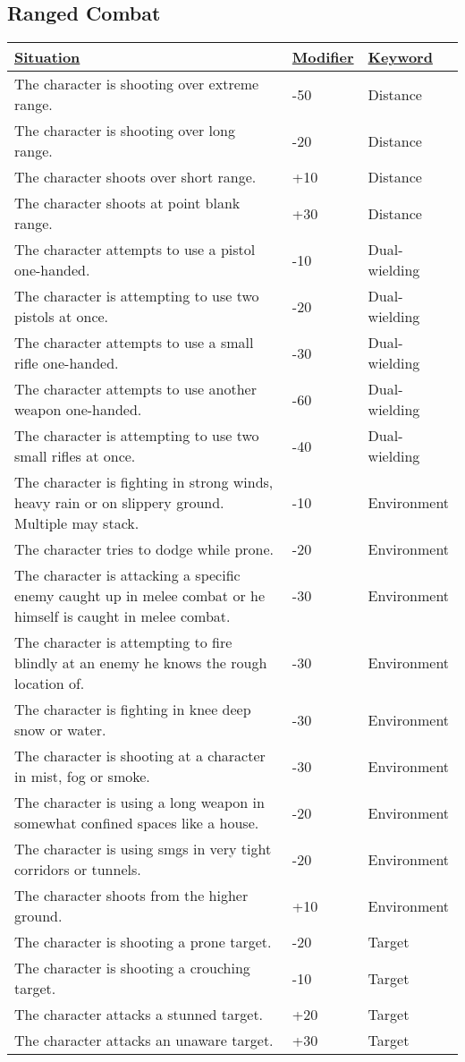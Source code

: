 \subsection{Ranged Combat}
\begin{tabularx}{\textwidth}{|X|l|l|}
	\hline
	\ul{Situation} & \ul{Modifier} & \ul{Keyword} \\ \hline
	The character is shooting over extreme range. & -50 & Distance \\ \hline
	The character is shooting over long range. & -20 & Distance \\ \hline
	The character shoots over short range. & +10 & Distance \\ \hline
	The character shoots at point blank range. & +30 & Distance \\ \hline
	The character attempts to use a pistol one-handed. & -10 & Dual-wielding \\ \hline
	The character is attempting to use two pistols at once. & -20 & Dual-wielding \\ \hline
	The character attempts to use a small rifle one-handed. & -30 & Dual-wielding \\ \hline
	The character attempts to use another weapon one-handed. & -60 & Dual-wielding \\ \hline
	The character is attempting to use two small rifles at once. & -40 & Dual-wielding \\ \hline
	The character is fighting in strong winds, heavy rain or on slippery ground. Multiple may stack. & -10 & Environment \\ \hline
	The character tries to dodge while prone. & -20 & Environment \\ \hline
	The character is attacking a specific enemy caught up in melee combat or he himself is caught in melee combat. & -30 & Environment \\ \hline
	The character is attempting to fire blindly at an enemy he knows the rough location of. & -30 & Environment \\ \hline
	The character is fighting in knee deep snow or water. & -30 & Environment \\ \hline
	The character is shooting at a character in mist, fog or smoke. & -30 & Environment \\ \hline
	The character is using a long weapon in somewhat confined spaces like a house. & -20 & Environment \\ \hline
	The character is using smgs in very tight corridors or tunnels. & -20 & Environment \\ \hline
	The character shoots from the higher ground. & +10 & Environment \\ \hline
	The character is shooting a prone target. & -20 & Target \\ \hline
	The character is shooting a crouching target. & -10 & Target \\ \hline
	The character attacks a stunned target. & +20 & Target \\ \hline
	The character attacks an unaware target. & +30 & Target \\ \hline
\end{tabularx}
